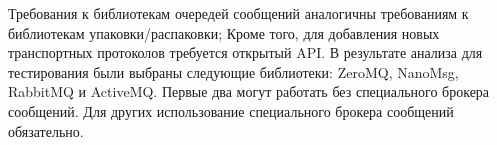 Требования к библиотекам очередей сообщений аналогичны требованиям к библиотекам упаковки/распаковки; Кроме того, для добавления новых транспортных протоколов требуется открытый API.
В результате анализа для тестирования были выбраны следующие библиотеки: ZeroMQ, NanoMsg, RabbitMQ и ActiveMQ. Первые два могут работать без специального брокера сообщений. Для других использование специального брокера сообщений обязательно.

